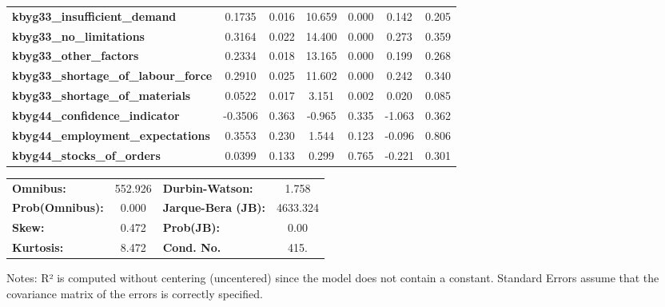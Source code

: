 \begin{center}
\begin{tabular}{lcccccc}
\textbf{kbyg33\_insufficient\_demand}        &       0.1735  &        0.016     &    10.659  &         0.000        &        0.142    &        0.205     \\
\textbf{kbyg33\_no\_limitations}             &       0.3164  &        0.022     &    14.400  &         0.000        &        0.273    &        0.359     \\
\textbf{kbyg33\_other\_factors}              &       0.2334  &        0.018     &    13.165  &         0.000        &        0.199    &        0.268     \\
\textbf{kbyg33\_shortage\_of\_labour\_force} &       0.2910  &        0.025     &    11.602  &         0.000        &        0.242    &        0.340     \\
\textbf{kbyg33\_shortage\_of\_materials}     &       0.0522  &        0.017     &     3.151  &         0.002        &        0.020    &        0.085     \\
\textbf{kbyg44\_confidence\_indicator}       &      -0.3506  &        0.363     &    -0.965  &         0.335        &       -1.063    &        0.362     \\
\textbf{kbyg44\_employment\_expectations}    &       0.3553  &        0.230     &     1.544  &         0.123        &       -0.096    &        0.806     \\
\textbf{kbyg44\_stocks\_of\_orders}          &       0.0399  &        0.133     &     0.299  &         0.765        &       -0.221    &        0.301     \\
\bottomrule
\end{tabular}
\begin{tabular}{lclc}
\textbf{Omnibus:}       & 552.926 & \textbf{  Durbin-Watson:     } &    1.758  \\
\textbf{Prob(Omnibus):} &   0.000 & \textbf{  Jarque-Bera (JB):  } & 4633.324  \\
\textbf{Skew:}          &   0.472 & \textbf{  Prob(JB):          } &     0.00  \\
\textbf{Kurtosis:}      &   8.472 & \textbf{  Cond. No.          } &     415.  \\
\bottomrule
\end{tabular}
\end{center}

Notes: \newline
 [1] R² is computed without centering (uncentered) since the model does not contain a constant. \newline
 [2] Standard Errors assume that the covariance matrix of the errors is correctly specified.